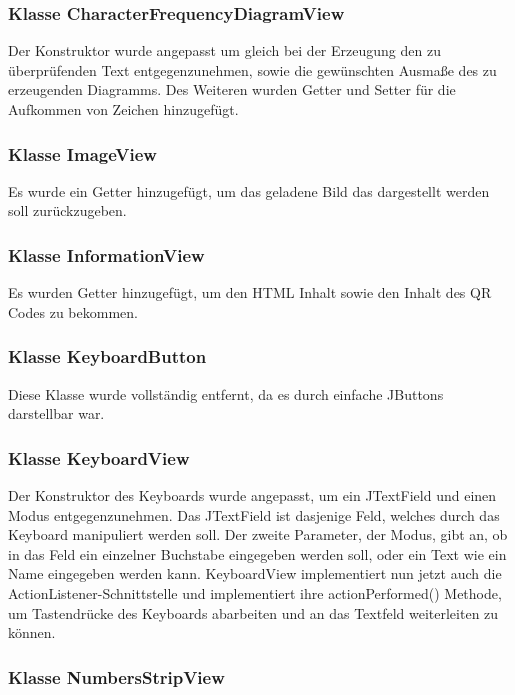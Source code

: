 \documentclass{article}
\begin{document}
	\subsubsection{Klasse CharacterFrequencyDiagramView}

	Der Konstruktor wurde angepasst um gleich bei der Erzeugung den zu überprüfenden Text
	entgegenzunehmen, sowie die gewünschten Ausmaße des zu erzeugenden Diagramms. Des Weiteren
	wurden Getter und Setter für die Aufkommen von Zeichen hinzugefügt.

	\subsubsection{Klasse ImageView}

	Es wurde ein Getter hinzugefügt, um das geladene Bild das dargestellt werden soll zurückzugeben.

	\subsubsection{Klasse InformationView}

	Es wurden Getter hinzugefügt, um den HTML Inhalt sowie den Inhalt des QR Codes zu bekommen.

	\subsubsection{Klasse KeyboardButton}

	Diese Klasse wurde vollständig entfernt, da es durch einfache JButtons darstellbar war.

	\subsubsection{Klasse KeyboardView}

	Der Konstruktor des Keyboards wurde angepasst, um ein JTextField und einen Modus entgegenzunehmen.
	Das JTextField ist dasjenige Feld, welches durch das Keyboard manipuliert werden soll. Der zweite
	Parameter, der Modus, gibt an, ob in das Feld ein einzelner Buchstabe eingegeben werden soll, oder
	ein Text wie ein Name eingegeben werden kann. KeyboardView implementiert nun jetzt auch die
	ActionListener-Schnittstelle und implementiert ihre actionPerformed() Methode, um Tastendrücke
	des Keyboards abarbeiten und an das Textfeld weiterleiten zu können.

	\subsubsection{Klasse NumbersStripView}
\end{document}
